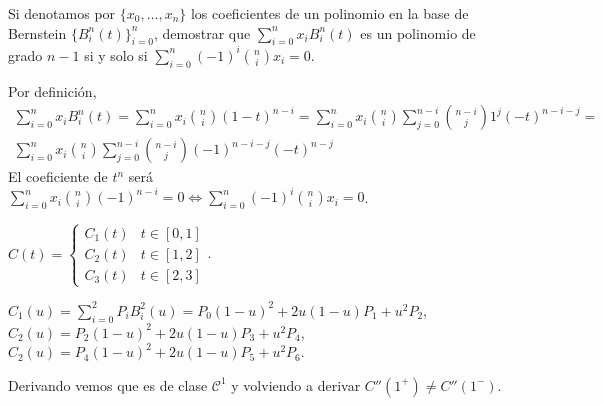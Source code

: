\documentclass[twoside]{article}
\begin{document}
\newpage

\begin{ejercicio}{3.2}
Si denotamos por $\{x_0,\dots,x_n\}$ los coeficientes de un polinomio en la base de Bernstein $\{B^n_i(t)\}_{i=0}^n$, demostrar que $\sum_{i=0}^nx_iB_i^n(t)$ es un polinomio de grado $n-1$ si y solo si $\sum_{i=0}^n(-1)^i\binom{n}{i}x_i=0$.
\end{ejercicio}
\begin{solucion}
Por definición, 
\begin{gather*}
\sum_{i=0}^nx_iB_i^n(t)=\sum_{i=0}^nx_i\binom{n}{i}(1-t)^{n-i}=\sum_{i=0}^nx_i\binom{n}{i}\sum_{j=0}^{n-i}\binom{n-i}{j}1^j(-t)^{n-i-j}=\\
\sum_{i=0}^nx_i\binom{n}{i}\sum_{j=0}^{n-i}\binom{n-i}{j}(-1)^{n-i-j}(-t)^{n-j}
\end{gather*}
El coeficiente de $t^n$ será $\sum_{i=0}^nx_i\binom{n}{i}(-1)^{n-i}=0\Leftrightarrow\sum_{i=0}^n(-1)^i\binom{n}{i}x_i=0$.
\end{solucion}

\newpage

\begin{ejercicio}{3.10}
\end{ejercicio}
\begin{solucion}
$C(t)=\begin{cases}
C_1(t) & t\in[0,1]\\
C_2(t) & t\in[1,2]\\
C_3(t) & t\in[2,3]
\end{cases}$. 

$C_1(u)=\sum_{i=0}^2P_iB_i^2(u)=P_0(1-u)^2+2u(1-u)P_1+u^2P_2$, $C_2(u)=P_2(1-u)^2+2u(1-u)P_3+u^2P_4$, $C_2(u)=P_4(1-u)^2+2u(1-u)P_5+u^2P_6$.

Derivando vemos que es de clase $\mathcal{C}^1$ y volviendo a derivar $C''(1^+)\neq C''(1^-)$.
\end{solucion}
\end{document}
